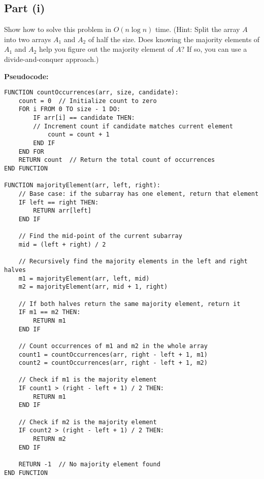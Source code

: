 \documentclass[a4paper,12pt]{report}
\begin{document}
\subsection*{Part (i)}
Show how to solve this problem in \( O(n \log n) \) time. (Hint: Split the array \( A \) into two arrays \( A_1 \) and \( A_2 \) of half the size. Does knowing the majority elements of \( A_1 \) and \( A_2 \) help you figure out the majority element of \( A \)? If so, you can use a divide-and-conquer approach.)

\newpage
\textbf{Pseudocode:}

\begin{tcolorbox}[colback=white, colframe=black, boxrule=0.5pt]
\ttfamily\small
\begin{verbatim}
FUNCTION countOccurrences(arr, size, candidate):
    count = 0  // Initialize count to zero
    FOR i FROM 0 TO size - 1 DO:
        IF arr[i] == candidate THEN:
		// Increment count if candidate matches current element
            count = count + 1  
        END IF
    END FOR
    RETURN count  // Return the total count of occurrences
END FUNCTION

FUNCTION majorityElement(arr, left, right):
    // Base case: if the subarray has one element, return that element
    IF left == right THEN:
        RETURN arr[left]
    END IF

    // Find the mid-point of the current subarray
    mid = (left + right) / 2

    // Recursively find the majority elements in the left and right halves
    m1 = majorityElement(arr, left, mid)
    m2 = majorityElement(arr, mid + 1, right)

    // If both halves return the same majority element, return it
    IF m1 == m2 THEN:
        RETURN m1
    END IF

    // Count occurrences of m1 and m2 in the whole array
    count1 = countOccurrences(arr, right - left + 1, m1)
    count2 = countOccurrences(arr, right - left + 1, m2)

    // Check if m1 is the majority element
    IF count1 > (right - left + 1) / 2 THEN:
        RETURN m1
    END IF

    // Check if m2 is the majority element
    IF count2 > (right - left + 1) / 2 THEN:
        RETURN m2
    END IF

    RETURN -1  // No majority element found
END FUNCTION
\end{verbatim}
\end{tcolorbox}
\end{document}
